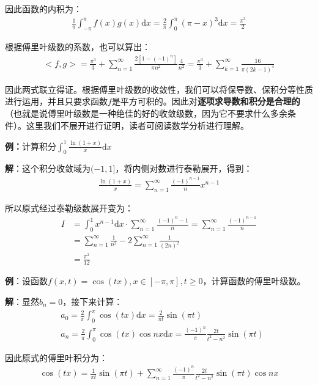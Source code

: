 \documentclass{ctexart}
\let\oldtextbf\textbf
\renewcommand{\textbf}[1]{\textcolor{brown!50!red}{\oldtextbf{#1}}}
\begin{document}
因此函数的内积为：
\begin{align*}
    \frac{1}{\pi}\int_{-\pi}^\pi f(x)g(x)\mathrm{d}x=\frac{2}{\pi}\int_0^\pi (\pi-x)^3\mathrm{d}x=\frac{\pi^3}{2}
\end{align*}

根据傅里叶级数的系数，也可以算出：
\begin{align*}
    <f,g>=\frac{\pi^3}{3}+\sum_{n=1}^\infty\frac{2[1-(-1)^n]}{\pi n^2}\frac{4}{n^2}=\frac{\pi^3}{3}+\sum_{k=1}^\infty\frac{16}{\pi(2k-1)^4}
\end{align*}

因此两式联立得证。根据傅里叶级数的收敛性，我们可以将保导数、保积分等性质进行运用，并且只要求函数$f$是平方可积的。因此对\textbf{\color{brown!50!red}逐项求导数和积分是合理的}（也就是说傅里叶级数是一种绝佳的好的收敛级数，因为它不要求什么多余条件）。这里我们不展开进行证明，读者可阅读数学分析进行理解。

\textbf{\color{brown!50!red}例：}计算积分$\int_0^1 \frac{\ln(1+x)}{x}\mathrm{d}x$

\textbf{\color{brown!50!red} 解}：这个积分收敛域为$(-1,1]$，将内侧对数进行泰勒展开，得到：
\begin{align*}
    \frac{\ln(1+x)}{x}=\sum_{n=1}^\infty\frac{(-1)^{n-1}}{n}x^{n-1}
\end{align*}

所以原式经过泰勒级数展开变为：
\begin{align*}
    I&=\int_0^1  x^{n-1}\mathrm{d}x\cdot \sum_{n=1}^\infty\frac{(-1)^n-1}{n}=\sum_{n=1}^\infty\frac{(-1)^{n-1}}{n}\\
    &=\sum_{n=1}^\infty \frac{1}{n^2}-2\sum_{n=1}^\infty\frac{1}{(2n)^2}\\
    &=\frac{\pi^2}{12}
\end{align*}

\textbf{\color{brown!50!red} 例}：设函数$f(x,t)=\cos(tx),x\in[-\pi,\pi],t\geq 0$，计算函数的傅里叶级数。

	\textbf{\color{brown!50!red} 解}：显然$b_n=0$，接下来计算：
\begin{align*}
&a_0=\frac{2}{\pi}\int_{0}^\pi \cos(tx)\mathrm{d}x=\frac{2}{\pi t}\sin(\pi t)\\
&a_n=\frac{2}{\pi}\int_{0}^\pi \cos(tx)\cos nx\mathrm{d}x=\frac{(-1)^n}{\pi}\frac{2t}{t^2-n^2}\sin(\pi t)  
\end{align*}

因此原式的傅里叶积分为：
\begin{align*}
    \cos (tx)=\frac{1}{\pi t}\sin(\pi t)+\sum_{n=1}^\infty\frac{(-1)^n}{\pi}\frac{2t}{t^2-n^2}\sin(\pi t) \cos nx
\end{align*}
\end{document}
